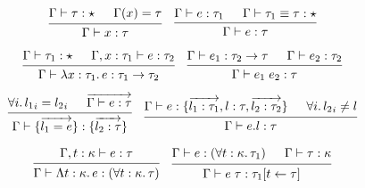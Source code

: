 \documentclass[lualatex,12pt,unicode]{article}
\begin{document}
\pagestyle{empty}

\[
    \begin{prooftree}
        \hypo{\Gamma \vdash \tau: \star}
        \hypo{\Gamma(x) = \tau}
        \infer2{\Gamma \vdash x: \tau}
    \end{prooftree}
    \hspace{1em}
    \begin{prooftree}
        \hypo{\Gamma \vdash e: \tau_1}
        \hypo{\Gamma \vdash \tau_1 \equiv \tau: \star}
        \infer2{\Gamma \vdash e: \tau}
    \end{prooftree}
\]

\[
    \begin{prooftree}
        \hypo{\Gamma \vdash \tau_1: \star}
        \hypo{\Gamma, x: \tau_1 \vdash e: \tau_2}
        \infer2{\Gamma \vdash \lambda x: \tau_1\ldotp e: \tau_1 \to \tau_2}
    \end{prooftree}
    \hspace{1em}
    \begin{prooftree}
        \hypo{\Gamma \vdash e_1: \tau_2 \to \tau}
        \hypo{\Gamma \vdash e_2: \tau_2}
        \infer2{\Gamma \vdash e_1\; e_2: \tau}
    \end{prooftree}
\]

\[
    \begin{prooftree}
        \hypo{\forall i\ldotp {l_1}_i = {l_2}_i}
        \hypo{\overrightarrow{\Gamma \vdash e: \tau}}
        \infer2{\Gamma \vdash \{\overrightarrow{l_1 = e}\}: \{\overrightarrow{l_2: \tau}\}}
    \end{prooftree}
    \hspace{1em}
    \begin{prooftree}
        \hypo{\Gamma \vdash e: \{\overrightarrow{l_1: \tau_1}, l: \tau, \overrightarrow{l_2: \tau_2}\}}
        \hypo{\forall i\ldotp {l_2}_i \neq l}
        \infer2{\Gamma \vdash e.l: \tau}
    \end{prooftree}
\]

\[
    \begin{prooftree}
        \hypo{\Gamma, t: \kappa \vdash e: \tau}
        \infer1{\Gamma \vdash \Lambda t: \kappa\ldotp e: (\forall t: \kappa\ldotp \tau)}
    \end{prooftree}
    \hspace{1em}
    \begin{prooftree}
        \hypo{\Gamma \vdash e: (\forall t: \kappa\ldotp \tau_1)}
        \hypo{\Gamma \vdash \tau: \kappa}
        \infer2{\Gamma \vdash e\; \tau: \tau_1[t \leftarrow \tau]}
    \end{prooftree}
\]
\end{document}
